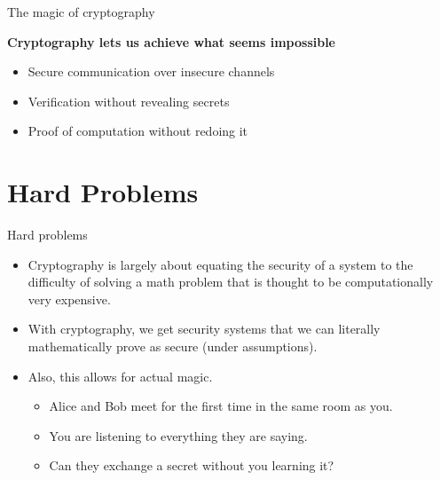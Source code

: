 \documentclass[aspectratio=169, lualatex, handout]{beamer}
\begin{document}
\begin{frame}[c]{The magic of cryptography}
	\begin{center}
		\Large\textbf{Cryptography lets us achieve what seems impossible}
		\vspace{1cm}
		\begin{itemize}[<+->]
			\item Secure communication over insecure channels
			\item Verification without revealing secrets
			\item Proof of computation without redoing it
		\end{itemize}
	\end{center}
\end{frame}

\section{Hard Problems}

\begin{frame}{Hard problems}
	\begin{itemize}[<+->]
		\item Cryptography is largely about equating the security of a system to the
		      difficulty of solving a math problem that is thought to be computationally
		      very expensive.
		\item With cryptography, we get security systems that we can literally
		      mathematically prove as secure (under assumptions).
		\item Also, this allows for actual magic.
		      \begin{itemize}[<+->]
			      \item Alice and Bob meet for the first time in the same room as you.
			      \item You are listening to everything they are saying.
			      \item Can they exchange a secret without you learning it?
		      \end{itemize}
	\end{itemize}
\end{frame}
\end{document}
